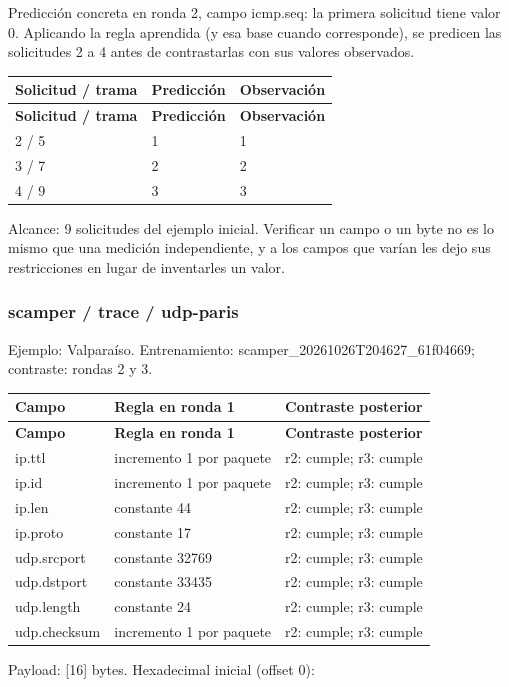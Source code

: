 Predicción concreta en ronda 2, campo icmp.seq: la primera solicitud tiene valor 0. Aplicando la regla aprendida (y esa base cuando corresponde), se predicen las solicitudes 2 a 4 antes de contrastarlas con sus valores observados.

\begingroup
\fontsize{9}{11}\selectfont
\addtocounter{table}{-1}
\begin{longtable}{p{3.2cm}p{5.1cm}p{5.1cm}}
\toprule
\textbf{Solicitud / trama} & \textbf{Predicción} & \textbf{Observación} \\ \midrule
\endfirsthead
\toprule
\textbf{Solicitud / trama} & \textbf{Predicción} & \textbf{Observación} \\ \midrule
\endhead
2 / 5 & 1 & 1 \\
3 / 7 & 2 & 2 \\
4 / 9 & 3 & 3 \\
\bottomrule
\end{longtable}
\endgroup
Alcance: 9 solicitudes del ejemplo inicial. Verificar un campo o un byte no es lo mismo que una medición independiente, y a los campos que varían les dejo sus restricciones en lugar de inventarles un valor.

\subsubsection{scamper / trace / udp-paris}
Ejemplo: Valparaíso. Entrenamiento: scamper\_\allowbreak{}20261026T204627\_\allowbreak{}61f04669; contraste: rondas 2 y 3. 

\begingroup
\fontsize{9}{11}\selectfont
\addtocounter{table}{-1}
\begin{longtable}{p{3.1cm}p{5.8cm}p{5.1cm}}
\toprule
\textbf{Campo} & \textbf{Regla en ronda 1} & \textbf{Contraste posterior} \\ \midrule
\endfirsthead
\toprule
\textbf{Campo} & \textbf{Regla en ronda 1} & \textbf{Contraste posterior} \\ \midrule
\endhead
ip.ttl & incremento 1 por paquete & r2: cumple; r3: cumple \\
ip.id & incremento 1 por paquete & r2: cumple; r3: cumple \\
ip.len & constante 44 & r2: cumple; r3: cumple \\
ip.proto & constante 17 & r2: cumple; r3: cumple \\
udp.srcport & constante 32769 & r2: cumple; r3: cumple \\
udp.dstport & constante 33435 & r2: cumple; r3: cumple \\
udp.length & constante 24 & r2: cumple; r3: cumple \\
udp.checksum & incremento 1 por paquete & r2: cumple; r3: cumple \\
\bottomrule
\end{longtable}
\endgroup
Payload: [16] bytes. Hexadecimal inicial (offset 0):

